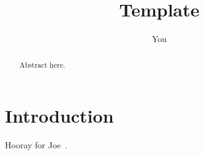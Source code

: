 \documentclass{article}
\title{Template}
\author{You}
\newcommand{\beginsupplement}{%
        \setcounter{table}{0}
        \renewcommand{\thetable}{S\arabic{table}}%
        \setcounter{figure}{0}
        \renewcommand{\thefigure}{S\arabic{figure}}%
     }
\begin{document}
\maketitle

\begin{abstract}
Abstract here.
\end{abstract}


\section*{Introduction}
Hooray for Joe~\cite{Felsenstein1981-zs}.







\end{document}
